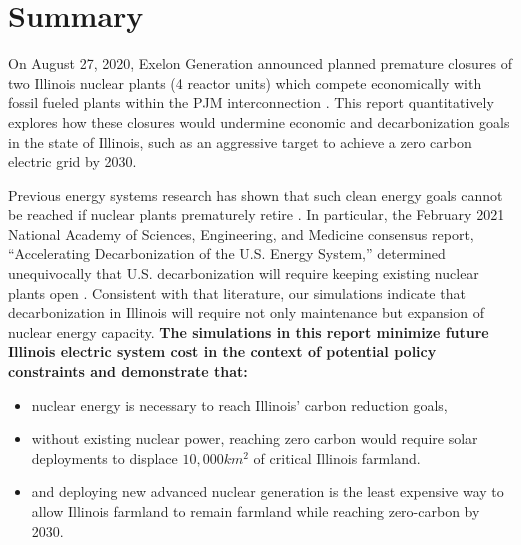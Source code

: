 \section{Summary}
On August 27, 2020, Exelon Generation announced planned premature closures of 
two Illinois nuclear plants (4 reactor units) which compete economically with 
fossil fueled plants within the \gls{PJM} interconnection \cite{larson_exelon_2020}. 
This report quantitatively explores how these closures would undermine economic 
and decarbonization goals in the state of Illinois, such as an aggressive 
target to achieve a zero carbon electric grid by 2030.

Previous energy systems research has shown that such clean energy goals cannot 
be reached if nuclear plants prematurely retire 
\cite{national_academies_of_sciences_engineering_and_medicine_2021_accelerating_2021,larson_net-zero_2020,davis_net-zero_2018}.  
In particular, the February 2021 National Academy of Sciences, Engineering, and 
Medicine consensus report, ``Accelerating Decarbonization of the U.S. Energy 
System,'' determined unequivocally that U.S. decarbonization will require keeping 
existing nuclear plants open 
\cite{national_academies_of_sciences_engineering_and_medicine_2021_accelerating_2021}. 
Consistent with that literature, our simulations indicate that decarbonization 
in Illinois will require not only maintenance but expansion of nuclear energy capacity. 
\textbf{The simulations in this report minimize future Illinois electric system 
cost in the context of potential policy constraints and demonstrate that:}

\begin{itemize}
        \item nuclear energy is necessary to reach Illinois' carbon reduction 
                goals,
        \item without existing nuclear power, reaching zero carbon would 
                require solar deployments to displace $10,000km^2$ of critical 
                Illinois 
                farmland.
        \item and deploying new advanced nuclear generation is the least expensive way to 
                allow Illinois farmland to remain farmland while reaching 
                zero-carbon by 2030.
  \end{itemize}

